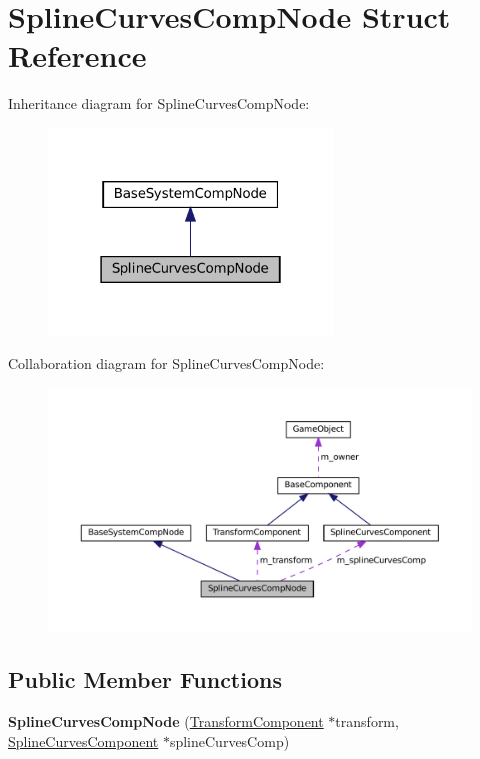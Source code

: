 \hypertarget{structSplineCurvesCompNode}{}\section{Spline\+Curves\+Comp\+Node Struct Reference}
\label{structSplineCurvesCompNode}


Inheritance diagram for Spline\+Curves\+Comp\+Node\+:
\nopagebreak
\begin{figure}[H]
\begin{center}
\leavevmode
\includegraphics[width=214pt]{structSplineCurvesCompNode__inherit__graph}
\end{center}
\end{figure}


Collaboration diagram for Spline\+Curves\+Comp\+Node\+:
\nopagebreak
\begin{figure}[H]
\begin{center}
\leavevmode
\includegraphics[width=350pt]{structSplineCurvesCompNode__coll__graph}
\end{center}
\end{figure}
\subsection*{Public Member Functions}
\begin{DoxyCompactItemize}
\item 
\mbox{\label{structSplineCurvesCompNode_a213c6825261cd289abb3ddc2d449f51b}} 
{\bfseries Spline\+Curves\+Comp\+Node} (\hyperlink{classTransformComponent}{Transform\+Component} $\ast$transform, \hyperlink{classSplineCurvesComponent}{Spline\+Curves\+Component} $\ast$spline\+Curves\+Comp)
\end{DoxyCompactItemize}
